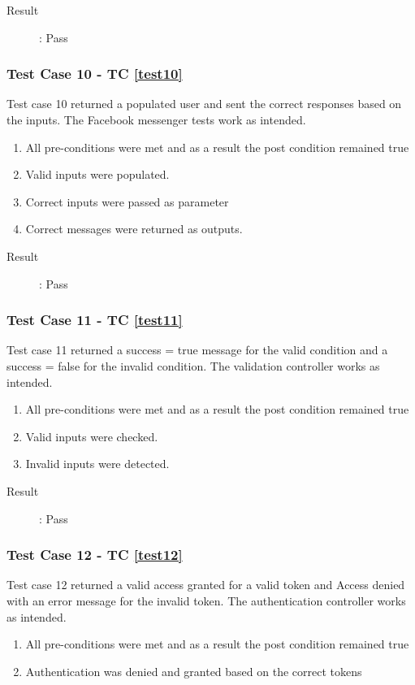 \documentclass{article}
\begin{document}
\begin{description}
	\item [Result]: Pass 
\end{description}


\subsubsection{Test Case 10 - TC \ref{test10}}
Test case 10 returned a populated user and sent the correct responses based on the inputs.
The Facebook messenger tests work as intended.
\begin{enumerate}
	\item All pre-conditions were met and as a result the post condition remained true
	\item Valid inputs were populated.
	\item Correct inputs were passed as parameter 
	\item Correct messages were returned as outputs.
\end{enumerate}

\begin{description}
	\item [Result]: Pass 
\end{description}


\subsubsection{Test Case 11 - TC \ref{test11}}
Test case 11 returned a success = true message for the valid condition and a success = false for the invalid condition.
The validation controller works as intended.
\begin{enumerate}
	\item All pre-conditions were met and as a result the post condition remained true
	\item Valid inputs were checked.
	\item Invalid inputs were detected.
\end{enumerate}

\begin{description}
	\item [Result]: Pass 
\end{description}


\subsubsection{Test Case 12 - TC \ref{test12}}
Test case 12 returned a valid access granted for a valid token and Access denied with an error message for the invalid token.
The authentication controller works as intended.
\begin{enumerate}
	\item All pre-conditions were met and as a result the post condition remained true
	\item Authentication was denied and granted based on the correct tokens
\end{enumerate}
\end{document}
